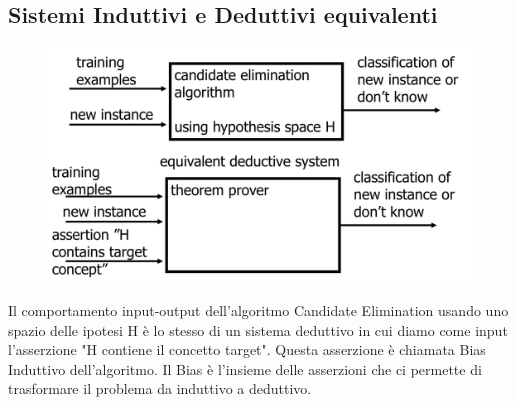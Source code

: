 \documentclass{article}
\begin{document}
\subsection{Sistemi Induttivi e Deduttivi equivalenti}
\begin{figure}[H]
    \centering
    \includegraphics[scale=0.4]{Images/sistemiinduttdedutt.png}
\end{figure}
Il comportamento input-output dell'algoritmo Candidate Elimination usando uno spazio delle ipotesi H è lo stesso di un sistema deduttivo in cui diamo come input l'asserzione "H contiene il concetto target". Questa asserzione è chiamata Bias Induttivo dell'algoritmo. \newline
Il Bias è l'insieme delle asserzioni che ci permette di trasformare il problema da induttivo a deduttivo.
\end{document}

